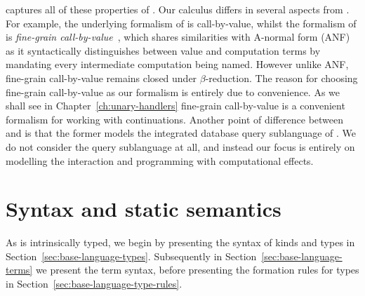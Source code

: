 \documentclass[12pt,phd,lfcs,twoside,openright,logo,leftchapter,normalheadings]{infthesis}
\theoremstyle{plain}
\theoremstyle{definition}
\begin{document}
\CoreLinks{} captures all of these properties of \Links{}. Our
calculus \BCalc{} differs in several aspects from \CoreLinks{}. For
example, the underlying formalism of \CoreLinks{} is call-by-value,
whilst the formalism of \BCalc{} is \emph{fine-grain
  call-by-value}~\cite{LevyPT03}, which shares similarities with
A-normal form (ANF)~\cite{FlanaganSDF93} as it syntactically
distinguishes between value and computation terms by mandating every
intermediate computation being named. However unlike ANF, fine-grain
call-by-value remains closed under $\beta$-reduction. The reason for
choosing fine-grain call-by-value as our formalism is entirely due to
convenience. As we shall see in Chapter~\ref{ch:unary-handlers}
fine-grain call-by-value is a convenient formalism for working with
continuations. Another point of difference between \CoreLinks{} and
\BCalc{} is that the former models the integrated database query
sublanguage of \Links{}. We do not consider the query sublanguage at
all, and instead our focus is entirely on modelling the interaction
and programming with computational effects.

\section{Syntax and static semantics}
\label{sec:syntax-base-language}

As \BCalc{} is intrinsically typed, we begin by presenting the syntax
of kinds and types in
Section~\ref{sec:base-language-types}. Subsequently in
Section~\ref{sec:base-language-terms} we present the term syntax,
before presenting the formation rules for types in
Section~\ref{sec:base-language-type-rules}.

\end{document}

